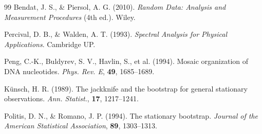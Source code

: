 \documentclass[10pt,a4paper,twocolumn]{article}
\theoremstyle{definition}
\theoremstyle{plain}
\begin{document}
\begin{thebibliography}{99}
Bendat, J. S., \& Piersol, A. G. (2010). \emph{Random Data: Analysis and Measurement Procedures} (4th ed.). Wiley.  %

Percival, D. B., \& Walden, A. T. (1993). \emph{Spectral Analysis for Physical Applications}. Cambridge UP.

Peng, C.-K., Buldyrev, S. V., Havlin, S., et al. (1994).
Mosaic organization of DNA nucleotides.
\emph{Phys. Rev. E}, \textbf{49}, 1685–1689.  %

Künsch, H. R. (1989). The jackknife and the bootstrap for general stationary observations.
\emph{Ann. Statist.}, \textbf{17}, 1217–1241.  %

Politis, D. N., \& Romano, J. P. (1994). The stationary bootstrap.
\emph{Journal of the American Statistical Association}, \textbf{89}, 1303–1313.

\end{thebibliography}

\balance %
\end{document}
